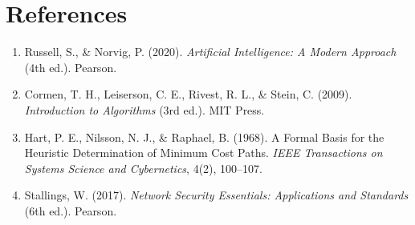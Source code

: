 \documentclass[12pt,a4paper]{article}
\begin{document}
\section*{References}
\begin{enumerate}
    \item Russell, S., \& Norvig, P. (2020). \textit{Artificial Intelligence: A Modern Approach} (4th ed.). Pearson.
    \item Cormen, T. H., Leiserson, C. E., Rivest, R. L., \& Stein, C. (2009). \textit{Introduction to Algorithms} (3rd ed.). MIT Press.
    \item Hart, P. E., Nilsson, N. J., \& Raphael, B. (1968). A Formal Basis for the Heuristic Determination of Minimum Cost Paths. \textit{IEEE Transactions on Systems Science and Cybernetics}, 4(2), 100--107.
    \item Stallings, W. (2017). \textit{Network Security Essentials: Applications and Standards} (6th ed.). Pearson.
\end{enumerate}
\end{document}

